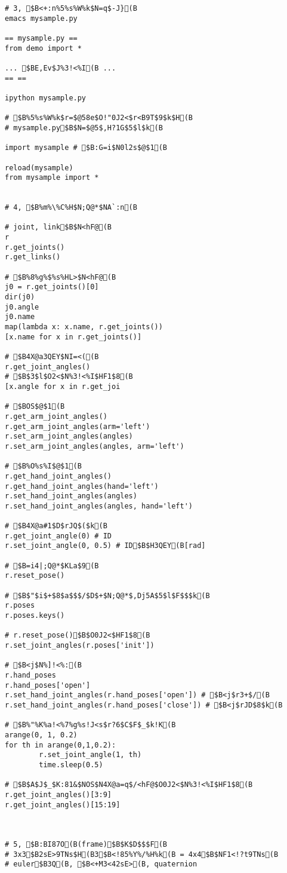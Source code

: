 \documentclass[11pt]{jreport}
\begin{document}
{{{{{{{{{{{{\begin{verbatim}
# 3, $B<+:n%5%s%W%k$N=q$-J}(B
emacs mysample.py

== mysample.py ==
from demo import *

... $BE,Ev$J%3!<%I(B ...
== ==

ipython mysample.py

# $B%5%s%W%k$r=$@58e$O!"0J2<$r<B9T$9$k$H(B
# mysample.py$B$N=$@5$,H?1G$5$l$k(B

import mysample # $B:G=i$N0l2s$@$1(B

reload(mysample)
from mysample import *


# 4, $B%m%\%C%H$N;Q@*$NA`:n(B

# joint, link$B$N<hF@(B
r
r.get_joints()
r.get_links()

# $B%8%g%$%s%HL>$N<hF@(B
j0 = r.get_joints()[0]
dir(j0)
j0.angle
j0.name
map(lambda x: x.name, r.get_joints())
[x.name for x in r.get_joints()]

# $B4X@a3QEY$NI=<((B
r.get_joint_angles()
# $B$3$l$O2<$N%3!<%I$HF1$8(B
[x.angle for x in r.get_joi

# $BOS$@$1(B
r.get_arm_joint_angles()
r.get_arm_joint_angles(arm='left')
r.set_arm_joint_angles(angles)
r.set_arm_joint_angles(angles, arm='left')

# $B%O%s%I$@$1(B
r.get_hand_joint_angles()
r.get_hand_joint_angles(hand='left')
r.set_hand_joint_angles(angles)
r.set_hand_joint_angles(angles, hand='left')

# $B4X@a#1$D$rJQ$($k(B
r.get_joint_angle(0) # ID
r.set_joint_angle(0, 0.5) # ID$B$H3QEY(B[rad]

# $B=i4|;Q@*$KLa$9(B
r.reset_pose()

# $B$"$i$+$8$a$$$/$D$+$N;Q@*$,Dj5A$5$l$F$$$k(B
r.poses
r.poses.keys()

# r.reset_pose()$B$O0J2<$HF1$8(B
r.set_joint_angles(r.poses['init'])

# $B<j$N%]!<%:(B
r.hand_poses
r.hand_poses['open']
r.set_hand_joint_angles(r.hand_poses['open']) # $B<j$r3+$/(B
r.set_hand_joint_angles(r.hand_poses['close']) # $B<j$rJD$8$k(B

# $B%"%K%a!<%7%g%s!J<s$r?6$C$F$_$k!K(B
arange(0, 1, 0.2)
for th in arange(0,1,0.2):
        r.set_joint_angle(1, th)
        time.sleep(0.5)

# $B$A$J$_$K:81&$NOS$N4X@a=q$/<hF@$O0J2<$N%3!<%I$HF1$8(B
r.get_joint_angles()[3:9]
r.get_joint_angles()[15:19]



# 5, $B:BI87O(B(frame)$B$K$D$$$F(B
# 3x3$B2sE>9TNs$H(B3$B<!85%Y%/%H%k(B = 4x4$B$NF1<!?t9TNs(B
# euler$B3Q(B, $B<+M3<42sE>(B, quaternion


\end{verbatim}}}}}}}}}}}}}
\end{document}
